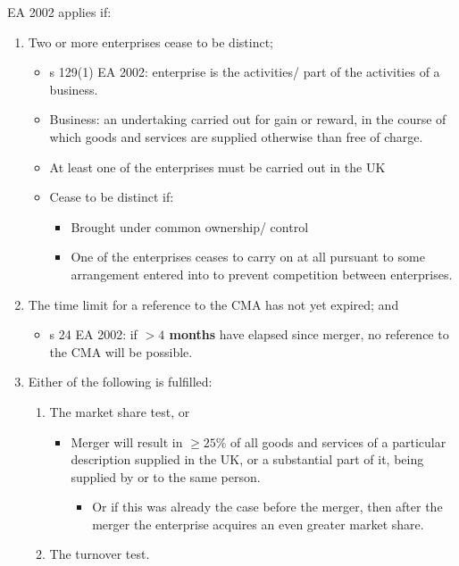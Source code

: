 \documentclass[
]{article}
\providecommand{\tightlist}{%
  \setlength{\itemsep}{0pt}\setlength{\parskip}{0pt}}
\begin{document}
EA 2002 applies if:

\begin{enumerate}
\tightlist
\item
  Two or more enterprises cease to be distinct;

  \begin{itemize}
  \tightlist
  \item
    s 129(1) EA 2002: enterprise is the activities/ part of the
    activities of a business.
  \item
    Business: an undertaking carried out for gain or reward, in the
    course of which goods and services are supplied otherwise than free
    of charge.
  \item
    At least one of the enterprises must be carried out in the UK
  \item
    Cease to be distinct if:

    \begin{itemize}
    \tightlist
    \item
      Brought under common ownership/ control
    \item
      One of the enterprises ceases to carry on at all pursuant to some
      arrangement entered into to prevent competition between
      enterprises.
    \end{itemize}
  \end{itemize}
\item
  The time limit for a reference to the CMA has not yet expired; and

  \begin{itemize}
  \tightlist
  \item
    s 24 EA 2002: if \textbf{{\(> 4\)} months} have elapsed since
    merger, no reference to the CMA will be possible.
  \end{itemize}
\item
  Either of the following is fulfilled:

  \begin{enumerate}
  \tightlist
  \item
    The market share test, or

    \begin{itemize}
    \tightlist
    \item
      Merger will result in {\(\geq 25\%\)} of all goods and services of
      a particular description supplied in the UK, or a substantial part
      of it, being supplied by or to the same person.

      \begin{itemize}
      \tightlist
      \item
        Or if this was already the case before the merger, then after
        the merger the enterprise acquires an even greater market share.
      \end{itemize}
    \end{itemize}
  \item
    The turnover test.


\end{enumerate}
\end{enumerate}
\end{document}
